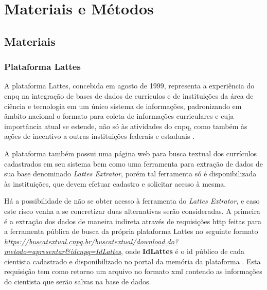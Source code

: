 \chapter{Materiais e Métodos}\label{cap:materialemetodos}

\section{Materiais}\label{sec:materiais}

\subsection{Plataforma Lattes}\label{subsec:lattes}

A plataforma Lattes, concebida em agosto de 1999, representa a experiência do \gls{cnpq} na integração de bases de dados de currículos e de instituições da área de ciência e tecnologia em um único sistema de informações, padronizando em âmbito nacional o formato para coleta de informações curriculares e cuja importância atual se estende, não só às atividades do \gls{cnpq}, como também às ações de incentivo a outras instituições federais e estaduais \cite{Lattes}.

A plataforma também possui uma página web para busca textual dos currículos cadastrados em seu sistema bem como uma ferramenta para extração de dados de sua base denominado \textit{Lattes Extrator}, porém tal ferramenta só é disponibilizada às instituições, que devem efetuar cadastro e solicitar acesso à mesma.

Há a possibilidade de não se obter acesso à ferramenta do \textit{Lattes Extrator}, e caso este risco venha a se concretizar duas alternativas serão consideradas. A primeira é a extração dos dados de maneira indireta através de requisições \gls{http} feitas para a ferramenta pública de busca da própria plataforma Lattes no seguinte formato \textit{\url{https://buscatextual.cnpq.br/buscatextual/download.do?metodo=apresentar&idcnpq=IdLattes}}, onde \textbf{IdLattes} é o id público de cada cientista cadastrado e disponibilizado no portal da memória da plataforma \cite{CnpqMemoria}. Esta requisição tem como retorno um arquivo no formato \gls{xml} contendo as informações do cientista que serão salvas na base de dados.

